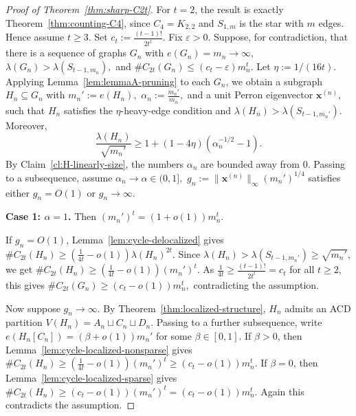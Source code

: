 \documentclass[10pt,a4paper]{amsart}
\begin{document}
\begin{proof}[Proof of Theorem~\ref{thm:sharp-C2t}]
For \(t=2\), the result is exactly Theorem~\ref{thm:counting-C4}, since
\(C_4=K_{2,2}\) and \(S_{1,m}\) is the star with \(m\) edges.  Hence
assume \(t\ge3\).  Set $c_t:=\frac{(t-1)!}{2t^t}.$
Fix \(\varepsilon>0\).  Suppose, for contradiction, that there is a
sequence of graphs \(G_n\) with
$e(G_n)=m_n\to\infty,$ $\lambda(G_n)>\lambda(S_{t-1,m_n}),$ 
and $\texttt{\#}C_{2t}(G_n)\le (c_t-\varepsilon)m_n^t.$
Let \(\eta:=1/(16t)\).  Applying Lemma~\ref{lem:lemmaA-pruning} to each
\(G_n\), we obtain a subgraph \(H_n\subseteq G_n\) with
$m_n':=e(H_n),$ $
        \alpha_n:=\frac{m_n'}{m_n},$
and a unit Perron eigenvector \(\bm{x}^{(n)}\), such that \(H_n\)
satisfies the \(\eta\)-heavy-edge condition and
$\lambda(H_n)>\lambda(S_{t-1,m_n'}).$
Moreover,
\[
        \frac{\lambda(H_n)}{\sqrt{m_n'}}
        \ge
        1+(1-4\eta)(\alpha_n^{-1/2}-1).
\]
By Claim~\ref{cl:H-linearly-size}, the numbers \(\alpha_n\) are bounded
away from \(0\).  Passing to a subsequence, assume
$\alpha_n\to\alpha\in(0,1],$ $       g_n:=\|\bm{x}^{(n)}\|_\infty(m_n')^{1/4}$
satisfies either \(g_n=O(1)\) or \(g_n\to\infty\).

\smallskip
\noindent\textbf{Case 1: \(\alpha=1\).}
Then \((m_n')^t=(1+o(1))m_n^t\).

If \(g_n=O(1)\), Lemma~\ref{lem:cycle-delocalized} gives
$\texttt{\#}C_{2t}(H_n)
        \ge
        \left(\frac{1}{4t}-o(1)\right)\lambda(H_n)^{2t}.$
Since \(\lambda(H_n)>\lambda(S_{t-1,m_n'})\ge\sqrt{m_n'}\), we get
$\texttt{\#}C_{2t}(H_n)
        \ge
        \left(\frac{1}{4t}-o(1)\right)(m_n')^t.$
As
$        \frac{1}{4t}\ge \frac{(t-1)!}{2t^t}=c_t$
for all \(t\ge2\), this gives $
        \texttt{\#}C_{2t}(G_n)
        \ge
        (c_t-o(1))m_n^t,$
contradicting the assumption.

Now suppose \(g_n\to\infty\).  By Theorem~\ref{thm:localized-structure},
\(H_n\) admits an ACD partition
$V(H_n)=A_n\sqcup C_n\sqcup D_n.$
Passing to a further subsequence, write
$        e(H_n[C_n])=(\beta+o(1))m_n'$
for some \(\beta\in[0,1]\).  If \(\beta>0\), then
Lemma~\ref{lem:cycle-localized-nonsparse} gives
        $\texttt{\#}C_{2t}(H_n)
        \ge
        \left(\frac{1}{4t}-o(1)\right)(m_n')^t
        \ge
        (c_t-o(1))m_n^t.$
If \(\beta=0\), then Lemma~\ref{lem:cycle-localized-sparse} gives
$\texttt{\#}C_{2t}(H_n)
        \ge
        (c_t-o(1))(m_n')^t
        =
        (c_t-o(1))m_n^t.
$
Again this contradicts the assumption.


\end{proof}
\end{document}
